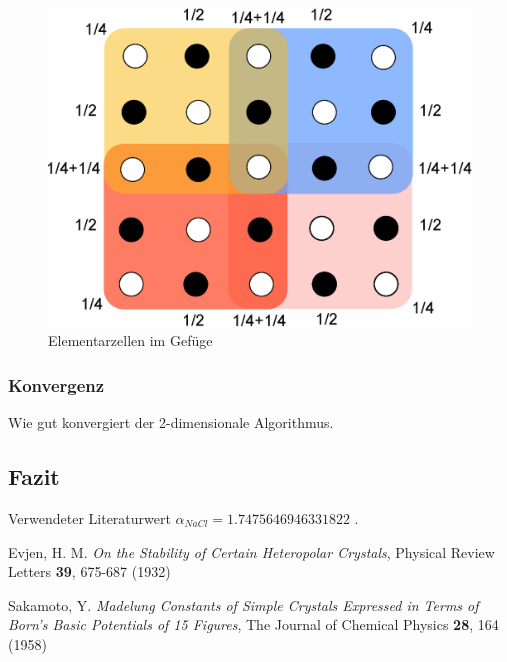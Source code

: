 \documentclass[10pt,a4paper]{article}
\begin{document}
\begin{figure}[h]
	\centering
	\includegraphics[scale = 0.35]{./figures/elementarzelle.eps}
	\caption{Elementarzellen im Gefüge}
	\label{zellensumme}
\end{figure}
	
\subsubsection{Konvergenz}

Wie gut konvergiert der 2-dimensionale Algorithmus.

\subsection{Fazit}

Verwendeter Literaturwert $\alpha_{NaCl} = 1.7475646946331822$ \cite{Sakamoto} .


\begin{thebibliography}{9}

Evjen, H. M.
\emph{On the Stability of Certain Heteropolar Crystals},
Physical Review Letters \textbf{39},
675-687 (1932)

Sakamoto, Y.
\emph{Madelung Constants of Simple Crystals Expressed in Terms of Born's Basic
Potentials of 15 Figures},
The Journal of Chemical Physics \textbf{28},
164 (1958)

\end{thebibliography}
\end{document}
